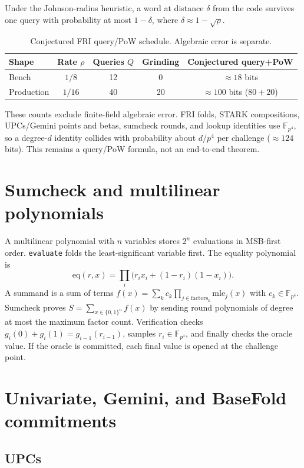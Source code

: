 \documentclass[11pt,a4paper]{article}
\newcommand{\zFpFour}{\mathbb{F}_{p^4}}
\newcommand{\zeq}{\mathrm{eq}}
\begin{document}
Under the Johnson-radius heuristic, a word at distance $\delta$ from the code
survives one query with probability at most $1-\delta$, where
$\delta\approx 1-\sqrt{\rho}$.

\begin{table}[h]
\centering
\small
\begin{tabular}{@{}lcccc@{}}
\toprule
Shape & Rate $\rho$ & Queries $Q$ & Grinding & Conjectured query+PoW \\
\midrule
Bench & $1/8$ & 12 & 0 & $\approx 18$ bits \\
Production & $1/16$ & 40 & 20 & $\approx 100$ bits ($80+20$) \\
\bottomrule
\end{tabular}
\caption{Conjectured FRI query/PoW schedule. Algebraic error is separate.}
\end{table}

These counts exclude finite-field algebraic error. FRI folds, STARK
compositions, UPCs/Gemini points and betas, sumcheck rounds, and lookup
identities use $\zFpFour$, so a degree-$d$ identity collides with probability
about $d/p^4$ per challenge ($\approx 124$ bits). This remains a query/PoW
formula, not an end-to-end theorem.

\section{Sumcheck and multilinear polynomials}

A multilinear polynomial with $n$ variables stores $2^n$ evaluations in
MSB-first order. \texttt{evaluate} folds the least-significant variable
first. The equality polynomial is
\[
\zeq(r,x)=\prod_i\bigl(r_ix_i+(1-r_i)(1-x_i)\bigr).
\]
A summand is a sum of terms
$f(x)=\sum_k c_k\prod_{j\in\mathrm{factors}_k}\mathrm{mle}_j(x)$ with
$c_k\in\zFpFour$. Sumcheck proves $S=\sum_{x\in\{0,1\}^n}f(x)$ by sending round
polynomials of degree at most the maximum factor count. Verification checks
$g_i(0)+g_i(1)=g_{i-1}(r_{i-1})$, samples $r_i\in\zFpFour$, and finally checks
the oracle value. If the oracle is committed, each final value is opened at
the challenge point.

\section{Univariate, Gemini, and BaseFold commitments}

\subsection{UPCs}
\end{document}
